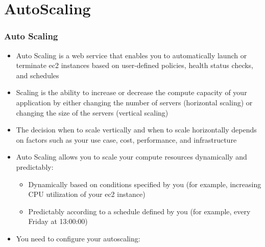 \documentclass{beamer}
\begin{document}
\section{AutoScaling}
\begin{frame}
\frametitle{Auto Scaling}
\begin{itemize}
 \item Auto Scaling is a web service that enables you to automatically launch or terminate \acrshort{ec2} instances based on user-defined policies, health status checks, and schedules
 \item Scaling is the ability to increase or decrease the compute capacity of your application by either changing the number of servers (horizontal scaling) or changing the size of the servers (vertical scaling)
\item The decision when to scale vertically and when to scale horizontally depends on factors such as your use case, cost, performance, and infrastructure
\item Auto Scaling allows you to scale your compute resources dynamically and predictably:
\begin{itemize}
 \item Dynamically based on conditions specified by you (for example, increasing CPU utilization of your \acrshort{ec2} instance)
 \item Predictably according to a schedule defined by you (for example, every Friday at 13:00:00)
\end{itemize}



\pagebreak

\item You need to configure your autoscaling:


\end{itemize}
\end{frame}
\end{document}
